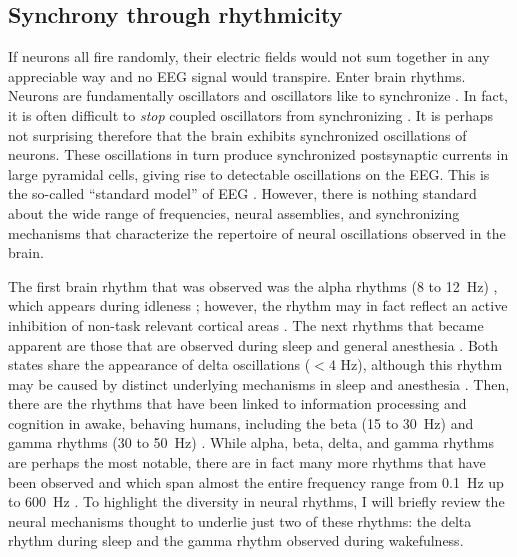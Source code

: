 \subsection{Synchrony through rhythmicity}  \label{sec:delta}
If neurons all fire randomly, their electric fields would not sum together in any appreciable way and no EEG signal would transpire. Enter brain rhythms. Neurons are fundamentally oscillators \cite{HODGKIN1952} and oscillators like to synchronize \cite{Strogatz2015}. In fact, it is often difficult to \textit{stop} coupled oscillators from synchronizing \cite{Erb1992}. It is perhaps not surprising therefore that the brain exhibits synchronized oscillations of neurons. These oscillations in turn produce synchronized postsynaptic currents in large pyramidal cells, giving rise to detectable oscillations on the EEG. This is the so-called ``standard model'' of EEG \cite{Cohen2017}. However, there is nothing standard about the wide range of frequencies, neural assemblies, and synchronizing mechanisms that characterize the repertoire of neural oscillations observed in the brain.

The first brain rhythm that was observed was the alpha rhythms (8 to \qty{12}{\hertz}) \cite{Berger1929}, which appears during idleness \cite{Adrian1934}; however, the rhythm may in fact reflect an active inhibition of non-task relevant cortical areas \cite{Cooper2003}. The next rhythms that became apparent are those that are observed during sleep \cite{Loomis1937,Weber2016} and general anesthesia \cite{GIBBS1937,Akeju2017}. Both states share the appearance of delta oscillations ($<4$ \unit{\hertz}), although this rhythm may be caused by distinct underlying mechanisms in sleep and anesthesia \cite{Akeju2017}. Then, there are the rhythms that have been linked to information processing and cognition in awake, behaving humans, including the beta (15 to \qty{30}{\hertz}) \cite{Spitzer2017} and gamma rhythms (30 to \qty{50}{\hertz}) \cite{JASPER1938,Fries2009}. While alpha, beta, delta, and gamma rhythms are perhaps the most notable, there are in fact many more rhythms that have been observed and which span almost the entire frequency range from \qty{0.1}{\hertz} up to \qty{600}{\hertz} \cite{Penttonen2003}. To highlight the diversity in neural rhythms, I will briefly review the neural mechanisms thought to underlie just two of these rhythms: the delta rhythm during sleep and the gamma rhythm observed during wakefulness.

